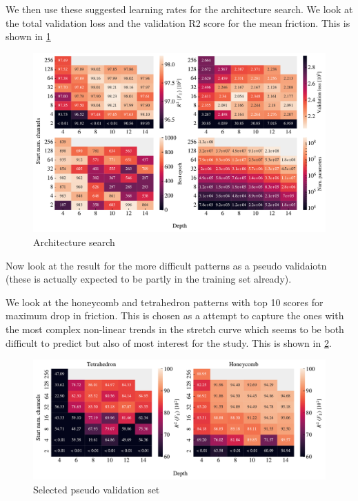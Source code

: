 We then use these suggested learning rates for the architecture search. We look at the total validation loss and the validation R2 score for the mean friction. This is shown in \cref{fig:A_search_perf} 

\begin{figure}[H]
  \centering
  \includegraphics[width=\linewidth]{figures/ML/A_search_perf.pdf}
  \caption{Architecture search}
  \label{fig:A_search_perf}
\end{figure}  





Now look at the result for the more difficult patterns as a pseudo validaiotn (these is actually expected to be partly in the training set already).

We look at the honeycomb and tetrahedron patterns with top 10 scores for maximum drop in friction. This is chosen as a attempt to capture the ones with the most complex non-linear trends in the stretch curve which seems to be both difficult to predict but also of most interest for the study. This is shown in \cref{fig:A_search_compare}.

\begin{figure}[H]
  \centering
  \includegraphics[width=\linewidth]{figures/ML/A_search_compare_perf}
  \caption{Selected pseudo validation set}
  \label{fig:A_search_compare}
\end{figure}  

